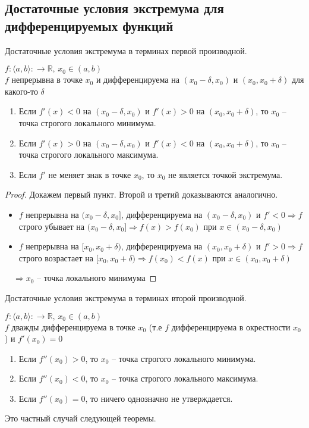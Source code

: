 \subsection{Достаточные условия экстремума для дифференцируемых функций \href{https://youtu.be/CAxh8kYEOlQ?t=1258}{\Walley}}
\begin{theorem-non}
    Достаточные условия экстремума в терминах первой производной.

    $f: \langle a, b \rangle: \to \mathbb{R}, \, x_0 \in (a, b)$ \\
    $f$ непрерывна в точке $x_0$ и дифференцируема на $(x_0 - \delta, x_0)$ и $(x_0, x_0 + \delta)$ для какого-то $\delta$
    \begin{enumerate}
        \item Если $f'(x) < 0$ на $(x_0 - \delta, x_0)$ и $f'(x) > 0$ на $(x_0, x_0 + \delta)$, то $x_0$ -- точка строгого локального минимума.
        \item Если $f'(x) > 0$ на $(x_0 - \delta, x_0)$ и $f'(x) < 0$ на $(x_0, x_0 + \delta)$, то $x_0$ -- точка строгого локального максимума.
        \item Если $f'$ не меняет знак в точке $x_0$, то $x_0$ не является точкой экстремума. 
    \end{enumerate}
\end{theorem-non}

\begin{proof}
    Докажем первый пункт. Второй и третий доказываются аналогично.
    \begin{itemize}
        \item $f$ непрерывна на $(x_0 - \delta, x_0]$, дифференцируема на $(x_0 - \delta, x_0)$ и $f' < 0 \Rightarrow f$ строго убывает на $(x_0 - \delta, x_0] \Rightarrow f(x) > f(x_0)$ при $x \in (x_0 - \delta, x_0)$
        \item  $f$ непрерывна на $[x_0, x_0 + \delta)$, дифференцируема на $(x_0, x_0 + \delta)$ и $f' > 0 \Rightarrow f$ строго возрастает на $[x_0, x_0 + \delta) \Rightarrow f(x_0) < f(x)$ при $x \in (x_0, x_0 + \delta)$
    \end{itemize}
    $\quad \Rightarrow x_0$ -- точка локального минимума
\end{proof}

\begin{theorem-non}
    Достаточные условия экстремума в терминах второй производной.

    $f: \langle a, b \rangle: \to \mathbb{R}, \, x_0 \in (a, b)$ \\
    $f$ дважды дифференцируема в точке $x_0$ (т.е $f$ дифференцируема в окрестности $x_0$) и $f'(x_0) = 0$
    \begin{enumerate}
        \item Если $f''(x_0) > 0$, то $x_0$ -- точка строгого локального минимума.
        \item Если $f''(x_0) < 0$, то $x_0$ -- точка строгого локального максимума.
        \item Если $f''(x_0) = 0$, то ничего однозначно не утверждается.
    \end{enumerate}

    Это частный случай следующей теоремы.
\end{theorem-non}

